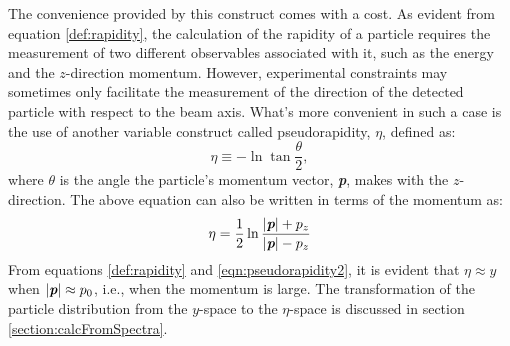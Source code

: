 The convenience provided by this construct comes with a cost. As evident from equation \ref{def:rapidity}, the calculation of the rapidity of a particle requires the measurement of two different observables associated with it, such as the energy and the $z$-direction momentum. However, experimental constraints may sometimes only facilitate the measurement of the direction of the detected particle with respect to the beam axis. What's more convenient in such a case is the use of another variable construct called pseudorapidity, $\eta$, defined as:
	\begin{equation}\label{def:pseudorapidity}
	\eta \equiv -\ln{\tan{\frac{\theta}{2}}},
	\end{equation}
where $\theta$ is the angle the particle's momentum vector, \textit{\textbf{p}}, makes with the $z$-direction. The above equation can also be written in terms of the momentum as:	
	\begin{equation}\label{eqn:pseudorapidity2}
	\eta = \frac{1}{2}\ln{\frac{\left|{\textit{\textbf{p}}}\right| + p_{z}}{\left|{\textit{\textbf{p}}}\right|- p_{z}}}
	\end{equation}
From equations \ref{def:rapidity} and \ref{eqn:pseudorapidity2}, it is evident that $\eta \approx y$ when $\left|{\textit{\textbf{p}}}\right| \approx p_{0}$, i.e., when the momentum is large. The transformation of the particle distribution from the $y$-space to the $\eta$-space is discussed in section \ref{section:calcFromSpectra}.
 

